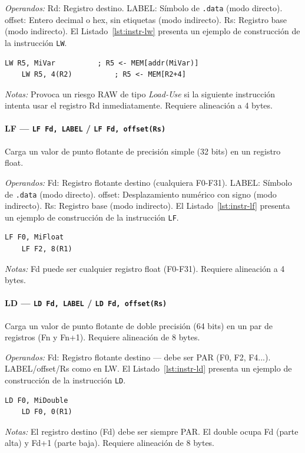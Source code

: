 \documentclass[../main.tex]{subfiles}
\begin{document}
\textit{Operandos:} Rd: Registro destino. LABEL: Símbolo de \texttt{.data} (modo directo). offset: Entero decimal o hex, sin etiquetas (modo indirecto). Rs: Registro base (modo indirecto).
El Listado~\ref{lst:instr-lw} presenta un ejemplo de construcción de la instrucción \texttt{LW}.

\begin{lstlisting}[caption={LW},label={lst:instr-lw}]
	LW R5, MiVar          ; R5 <- MEM[addr(MiVar)]
	LW R5, 4(R2)          ; R5 <- MEM[R2+4]
\end{lstlisting}
\textit{Notas:} Provoca un riesgo RAW de tipo \textit{Load-Use} si la siguiente instrucción intenta usar el registro Rd inmediatamente. Requiere alineación a 4 bytes.

\paragraph*{LF --- \texttt{LF Fd, LABEL} / \texttt{LF Fd, offset(Rs)}}
Carga un valor de punto flotante de precisión simple (32 bits) en un registro float.

\textit{Operandos:} Fd: Registro flotante destino (cualquiera F0-F31). LABEL: Símbolo de \texttt{.data} (modo directo). offset: Desplazamiento numérico con signo (modo indirecto). Rs: Registro base (modo indirecto).
El Listado~\ref{lst:instr-lf} presenta un ejemplo de construcción de la instrucción \texttt{LF}.

\begin{lstlisting}[caption={LF},label={lst:instr-lf}]
	LF F0, MiFloat
	LF F2, 8(R1)
\end{lstlisting}
\textit{Notas:} Fd puede ser cualquier registro float (F0-F31). Requiere alineación a 4 bytes.

\paragraph*{LD --- \texttt{LD Fd, LABEL} / \texttt{LD Fd, offset(Rs)}}
Carga un valor de punto flotante de doble precisión (64 bits) en un par de registros (Fn y Fn+1). Requiere alineación de 8 bytes.

\textit{Operandos:} Fd: Registro flotante destino --- debe ser PAR (F0, F2, F4...). LABEL/offset/Rs como en LW.
El Listado~\ref{lst:instr-ld} presenta un ejemplo de construcción de la instrucción \texttt{LD}.

\begin{lstlisting}[caption={LD},label={lst:instr-ld}]
	LD F0, MiDouble
	LD F0, 0(R1)
\end{lstlisting}
\textit{Notas:} El registro destino (Fd) debe ser siempre PAR. El double ocupa Fd (parte alta) y Fd+1 (parte baja). Requiere alineación de 8 bytes.
\end{document}
